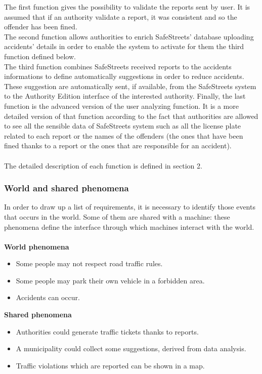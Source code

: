 \documentclass{article}
\begin{document}
    	    The first function gives the possibility to validate the reports sent by user. It is assumed that if an authority validate a report, it was consistent and so the offender has been fined.\\
    	    The second function allows authorities to enrich SafeStreets' database uploading accidents' details in order to enable the system to activate for them the third function defined below.\\
    	    The third function combines SafeStreets received reports to the accidents informations to define automatically suggestions in order to reduce accidents. These suggestion are automatically sent, if available, from the SafeStreets system to the Authority Edition interface of the interested authority.
    	    Finally, the last function is the advanced version of the user analyzing function. It is a more detailed version of that function according to the fact that authorities are allowed to see all the sensible data of SafeStreets system such as all the license plate related to each report or the names of the offenders (the ones that have been fined thanks to a report or the ones that are responsible for an accident).\\\\
    		The detailed description of each function is defined in section 2.
    	    
			\subsubsection{World and shared phenomena}
				In order to draw up a list of requirements, it is necessary to identify those events that occurs in the world. Some of them are shared with a machine: these phenomena define the interface through which machines interact with the world.\\\\				
				\textbf{World phenomena}
				\begin{itemize}
					\item Some people may not respect road traffic rules.
					\item Some people may park their own vehicle in a forbidden area.
					\item Accidents can occur.
				\end{itemize}
				\textbf{Shared phenomena}
				\begin{itemize}
					\item Authorities could generate traffic tickets thanks to reports. 
					\item A municipality could collect some suggestions, derived from data analysis.
					\item Traffic violations which are reported can be shown in a map.
				\end{itemize}
\end{document}
